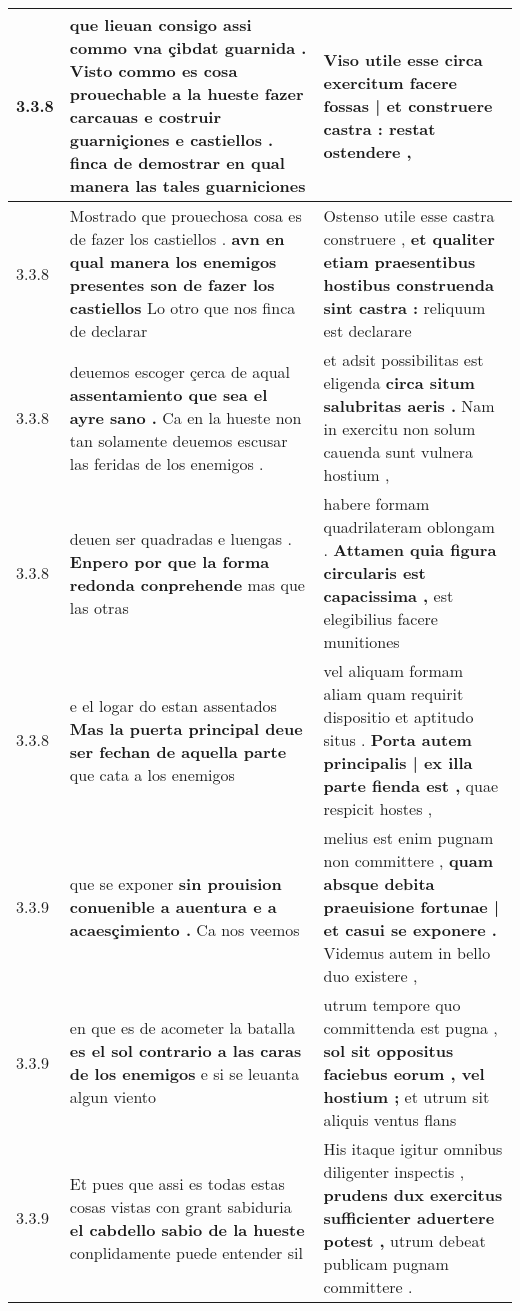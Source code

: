 \begin{tabular}{|p{1cm}|p{6.5cm}|p{6.5cm}|}
3.3.8 & que lieuan consigo assi commo vna çibdat guarnida . \textbf{ Visto commo es cosa prouechable a la hueste fazer carcauas e costruir guarniçiones e castiellos . } finca de demostrar en qual manera las tales guarniciones & Viso utile esse \textbf{ circa exercitum facere fossas | et construere castra : } restat ostendere , \\\hline
3.3.8 & Mostrado que prouechosa cosa es de fazer los castiellos . \textbf{ avn en qual manera los enemigos presentes son de fazer los castiellos } Lo otro que nos finca de declarar & Ostenso utile esse castra construere , \textbf{ et qualiter etiam praesentibus hostibus construenda sint castra : } reliquum est declarare \\\hline
3.3.8 & deuemos escoger çerca de aqual \textbf{ assentamiento que sea el ayre sano . } Ca en la hueste non tan solamente deuemos escusar las feridas de los enemigos . & et adsit possibilitas est eligenda \textbf{ circa situm salubritas aeris . } Nam in exercitu non solum cauenda sunt vulnera hostium , \\\hline
3.3.8 & deuen ser quadradas e luengas . \textbf{ Enpero por que la forma redonda conprehende } mas que las otras & habere formam quadrilateram oblongam . \textbf{ Attamen quia figura circularis est capacissima , } est elegibilius facere munitiones \\\hline
3.3.8 & e el logar do estan assentados \textbf{ Mas la puerta principal deue ser fechan de aquella parte } que cata a los enemigos & vel aliquam formam aliam quam requirit dispositio et aptitudo situs . \textbf{ Porta autem principalis | ex illa parte fienda est , } quae respicit hostes , \\\hline
3.3.9 & que se exponer \textbf{ sin prouision conuenible a auentura e a acaesçimiento . } Ca nos veemos & melius est enim pugnam non committere , \textbf{ quam absque debita praeuisione fortunae | et casui se exponere . } Videmus autem in bello duo existere , \\\hline
3.3.9 & en que es de acometer la batalla \textbf{ es el sol contrario a las caras de los enemigos } e si se leuanta algun viento & utrum tempore quo committenda est pugna , \textbf{ sol sit oppositus faciebus eorum , vel hostium ; } et utrum sit aliquis ventus flans \\\hline
3.3.9 & Et pues que assi es todas estas cosas vistas con grant sabiduria \textbf{ el cabdello sabio de la hueste } conplidamente puede entender sil & His itaque igitur omnibus diligenter inspectis , \textbf{ prudens dux exercitus sufficienter aduertere potest , } utrum debeat publicam pugnam committere . \\\hline

\end{tabular}
